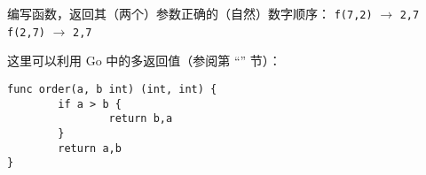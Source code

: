 \begin{Exercise}[title={整数顺序},difficulty=3]
\label{ex:ordering function}
\Question 编写函数，返回其（两个）参数正确的（自然）数字顺序：
\newline 
\lstinline{f(7,2)} $\rightarrow$ \lstinline{2,7}\newline
\lstinline{f(2,7)} $\rightarrow$ \lstinline{2,7}\newline
\end{Exercise}

\begin{Answer}
\Question 
这里可以利用 Go 中的多返回值（参阅第 ``'' 节）：
\begin{lstlisting}
func order(a, b int) (int, int) {
        if a > b { 
                return b,a 
        }   
        return a,b 
}
\end{lstlisting}

\end{Answer}
